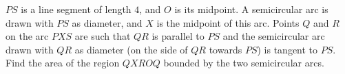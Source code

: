 $PS$ is a line segment of length $4$, and $O$ is its midpoint. A semicircular arc is drawn with $PS$ as diameter, and $X$ is the midpoint of this arc. Points $Q$ and $R$ on the arc $PXS$ are such that $QR$ is parallel to $PS$ and the semicircular arc drawn with $QR$ as diameter (on the side of $QR$ towards $PS$) is tangent to $PS$. Find the area of the region $QXROQ$ bounded by the two semicircular arcs.
